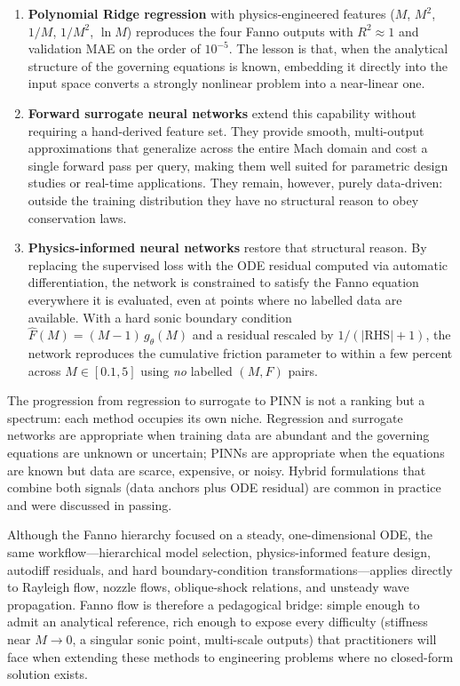 \documentclass[11pt,a4paper]{report}
\begin{document}
\begin{enumerate}
    \item \textbf{Polynomial Ridge regression} with physics-engineered features ($M$, $M^{2}$, $1/M$, $1/M^{2}$, $\ln M$) reproduces the four Fanno outputs with $R^{2}\!\approx\!1$ and validation MAE on the order of $10^{-5}$. The lesson is that, when the analytical structure of the governing equations is known, embedding it directly into the input space converts a strongly nonlinear problem into a near-linear one.
    \item \textbf{Forward surrogate neural networks} extend this capability without requiring a hand-derived feature set. They provide smooth, multi-output approximations that generalize across the entire Mach domain and cost a single forward pass per query, making them well suited for parametric design studies or real-time applications. They remain, however, purely data-driven: outside the training distribution they have no structural reason to obey conservation laws.
    \item \textbf{Physics-informed neural networks} restore that structural reason. By replacing the supervised loss with the ODE residual computed via automatic differentiation, the network is constrained to satisfy the Fanno equation everywhere it is evaluated, even at points where no labelled data are available. With a hard sonic boundary condition $\hat{F}(M) = (M-1)\,g_{\theta}(M)$ and a residual rescaled by $1/(|\mathrm{RHS}|+1)$, the network reproduces the cumulative friction parameter to within a few percent across $M \in [0.1, 5]$ using \emph{no} labelled $(M, F)$ pairs.
\end{enumerate}

The progression from regression to surrogate to PINN is not a ranking but a spectrum: each method occupies its own niche. Regression and surrogate networks are appropriate when training data are abundant and the governing equations are unknown or uncertain; PINNs are appropriate when the equations are known but data are scarce, expensive, or noisy. Hybrid formulations that combine both signals (data anchors plus ODE residual) are common in practice and were discussed in passing.

Although the Fanno hierarchy focused on a steady, one-dimensional ODE, the same workflow---hierarchical model selection, physics-informed feature design, autodiff residuals, and hard boundary-condition transformations---applies directly to Rayleigh flow, nozzle flows, oblique-shock relations, and unsteady wave propagation. Fanno flow is therefore a pedagogical bridge: simple enough to admit an analytical reference, rich enough to expose every difficulty (stiffness near $M\!\to\!0$, a singular sonic point, multi-scale outputs) that practitioners will face when extending these methods to engineering problems where no closed-form solution exists.
\end{document}
